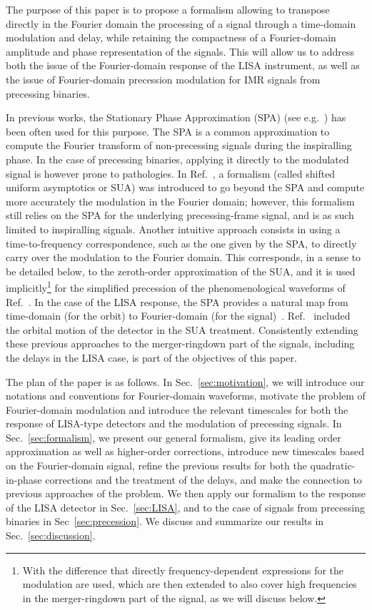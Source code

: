 \documentclass[aps,showpacs,twocolumn,
prd,superscriptaddress,nofootinbib]{revtex4-1}
\begin{document}
The purpose of this paper is to propose a formalism allowing to transpose directly in the Fourier domain the processing of a signal through a time-domain modulation and delay, while retaining the compactness of a Fourier-domain amplitude and phase representation of the signals. This will allow us to address both the issue of the Fourier-domain response of the LISA instrument, as well as the issue of Fourier-domain precession modulation for IMR signals from precessing binaries.

In previous works, the Stationary Phase Approximation (SPA) (see e.g.~\cite{Thorne300, CF94}) has been often used for this purpose. The SPA is a common approximation to compute the Fourier transform of non-precessing signals during the inspiralling phase. In the case of precessing binaries, applying it directly to the modulated signal is however prone to pathologies. In Ref.~\cite{KCY13,KCY14}, a formalism (called shifted uniform asymptotics or SUA) was introduced to go beyond the SPA and compute more accurately the modulation in the Fourier domain; however, this formalism still relies on the SPA for the underlying precessing-frame signal, and is as such limited to inspiralling signals. Another intuitive approach consists in using a time-to-frequency correspondence, such as the one given by the SPA, to directly carry over the modulation to the Fourier domain. This corresponds, in a sense to be detailed below, to the zeroth-order approximation of the SUA, and it is used implicitly\footnote{With the difference that directly frequency-dependent expressions for the modulation are used, which are then extended to also cover high frequencies in the merger-ringdown part of the signal, as we will discuss below.} for the simplified precession of the phenomenological waveforms of Ref.~\cite{Hannam+13}. In the case of the LISA response, the SPA provides a natural map from time-domain (for the orbit) to Fourier-domain (for the signal)~\cite{Cutler97}. Ref.~\cite{Klein+15} included the orbital motion of the detector in the SUA treatment. Consistently extending these previous approaches to the merger-ringdown part of the signals, including the delays in the LISA case, is part of the objectives of this paper.

The plan of the paper is as follows. In Sec.~\ref{sec:motivation}, we will introduce our notations and conventions for Fourier-domain waveforms, motivate the problem of Fourier-domain modulation and introduce the relevant timescales for both the response of LISA-type detectors and the modulation of precessing signals. In Sec.~\ref{sec:formalism}, we present our general formalism, give its leading order approximation as well as higher-order corrections, introduce new timescales based on the Fourier-domain signal, refine the previous results for both the quadratic-in-phase corrections and the treatment of the delays, and make the connection to previous approaches of the problem. We then apply our formalism to the response of the LISA detector in Sec.~\ref{sec:LISA}, and to the case of signals from precessing binaries in Sec~\ref{sec:precession}. We discuss and summarize our results in Sec.~\ref{sec:discussion}.
\end{document}
